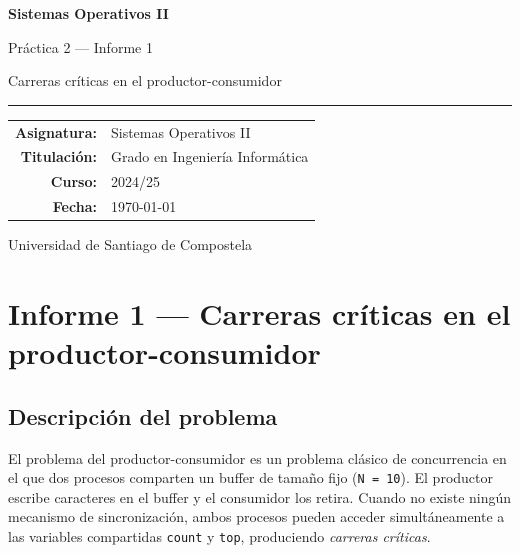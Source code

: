 \documentclass[a4paper, 12pt]{article}
\newcommand{\ic}[1]{\texttt{#1}}
\begin{document}
\begin{titlepage}
  \centering
  \vspace*{3cm}
  {\Huge\bfseries\color{azul} Sistemas Operativos II\par}
  \vspace{0.6cm}
  {\LARGE Práctica 2 --- Informe 1\par}
  \vspace{0.4cm}
  {\large\color{gray} Carreras críticas en el productor-consumidor\par}
  \vspace{0.5cm}
  \textcolor{azul}{\rule{0.7\linewidth}{1.2pt}}
  \vspace{2cm}

  \begin{tabular}{rl}
    \textbf{Asignatura:} & Sistemas Operativos II \\[4pt]
    \textbf{Titulación:} & Grado en Ingeniería Informática \\[4pt]
    \textbf{Curso:}      & 2024/25 \\[4pt]
    \textbf{Fecha:}      & \today \\
  \end{tabular}

  \vfill
  {\small Universidad de Santiago de Compostela}
\end{titlepage}

\tableofcontents
\newpage

\section{Informe 1 --- Carreras críticas en el productor-consumidor}

\subsection{Descripción del problema}

El problema del productor-consumidor es un problema clásico de concurrencia
en el que dos procesos comparten un buffer de tamaño fijo (\ic{N~=~10}).
El productor escribe caracteres en el buffer y el consumidor los retira.
Cuando no existe ningún mecanismo de sincronización, ambos procesos pueden
acceder simultáneamente a las variables compartidas \ic{count} y \ic{top},
produciendo \emph{carreras críticas}.
\end{document}
